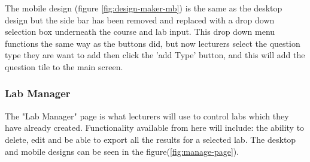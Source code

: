 \documentclass[12pt]{article}  %
\begin{document}
The mobile design (figure \ref{fig:design-maker-mb}) is the same as the desktop design but the side bar has been removed and replaced with a drop down selection box underneath the course and lab input. This drop down menu functions the same way as the buttons did, but now lecturers select the question type they are want to add then click the 'add Type' button, and this will add the question tile to the main screen.


\subsubsection{Lab Manager}
The "Lab Manager" page is what lecturers will use to control labs which they have already created. Functionality available from here will include: the ability to delete, edit and be able to export all the results for a selected lab. The desktop and mobile designs can be seen in the figure(\ref{fig:manage-page}). 
\end{document}

